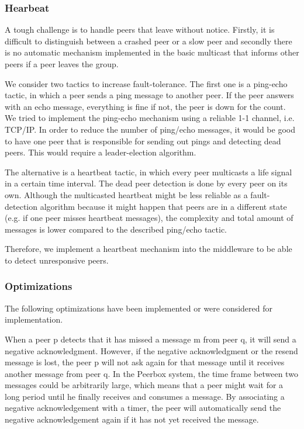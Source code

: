 \subsubsection{Hearbeat}
A tough challenge is to handle peers that leave without notice. Firstly, it is difficult to distinguish between a crashed peer or a slow peer and  secondly there is no automatic mechanism implemented in the basic multicast that informs other peers if a peer leaves the group.

We consider two tactics to increase fault-tolerance. The first one is a ping-echo tactic, in which a peer sends a ping message to another peer. If the peer answers with an echo message, everything is fine if not, the peer is down for the count. We tried to implement the ping-echo mechanism using a reliable 1-1 channel, i.e. TCP/IP. In order to reduce the number of ping/echo messages, it would be good to have one peer that is responsible for sending out pings and detecting dead peers. This would require a leader-election algorithm.

The alternative is a heartbeat tactic, in which every peer multicasts a life signal in a certain time interval. The dead peer detection is done by every peer on its own. Although the multicasted heartbeat might be less reliable as a fault-detection algorithm because it might happen that peers are in a different state (e.g. if one peer misses heartbeat messages), the complexity and total amount of messages is lower compared to the described ping/echo tactic.

Therefore, we implement a heartbeat mechanism into the middleware to be able to detect unresponsive peers.
\clearpage
\subsubsection{Optimizations}
The following optimizations have been implemented or were considered for implementation.

When a peer p detects that it has missed a message m from peer q, it will send a negative acknowledgment. However, if the negative acknowledgment or the resend message is lost, the peer p will not ask again for that message until it receives another message from peer q. 
In the Peerbox system, the time frame between two messages could be arbitrarily large, which means that a peer might wait for a long period until he finally receives and consumes a message. 
By associating a negative acknowledgement with a timer, the peer will automatically send the negative acknowledgement again if it has not yet received the message.

